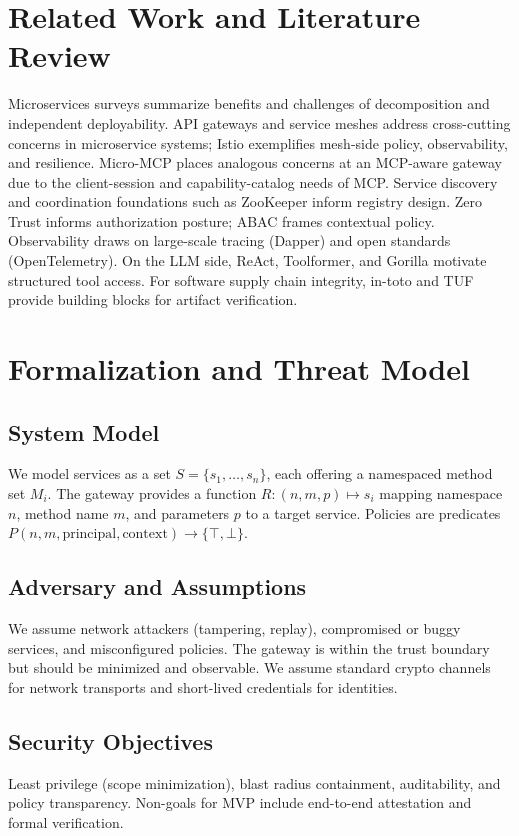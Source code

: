 \documentclass[conference]{IEEEtran}
\begin{document}
\section{Related Work and Literature Review}
Microservices surveys summarize benefits and challenges of decomposition and independent deployability\cite{dragoni-microservices, jamshidi-survey}. API gateways and service meshes address cross-cutting concerns in microservice systems; Istio\cite{istio} exemplifies mesh-side policy, observability, and resilience. Micro-MCP places analogous concerns at an MCP-aware gateway due to the client-session and capability-catalog needs of MCP. Service discovery and coordination foundations such as ZooKeeper\cite{zookeeper} inform registry design. Zero Trust\cite{nist-zt} informs authorization posture; ABAC\cite{nist-abac} frames contextual policy. Observability draws on large-scale tracing (Dapper\cite{dapper}) and open standards (OpenTelemetry\cite{otel}). On the LLM side, ReAct\cite{react}, Toolformer\cite{toolformer}, and Gorilla\cite{gorilla} motivate structured tool access. For software supply chain integrity, in-toto\cite{intoto} and TUF\cite{tuf} provide building blocks for artifact verification.

\section{Formalization and Threat Model}
\subsection{System Model}
We model services as a set \(S = \{s_1, \dots, s_n\}\), each offering a namespaced method set \(M_i\). The gateway provides a function \(R: (n, m, p) \mapsto s_i\) mapping namespace \(n\), method name \(m\), and parameters \(p\) to a target service. Policies are predicates \(P(n,m,\text{principal},\text{context})\rightarrow\{\top,\bot\}\).

\subsection{Adversary and Assumptions}
We assume network attackers (tampering, replay), compromised or buggy services, and misconfigured policies. The gateway is within the trust boundary but should be minimized and observable. We assume standard crypto channels for network transports and short-lived credentials for identities.

\subsection{Security Objectives}
Least privilege (scope minimization), blast radius containment, auditability, and policy transparency. Non-goals for MVP include end-to-end attestation and formal verification.
\end{document}
